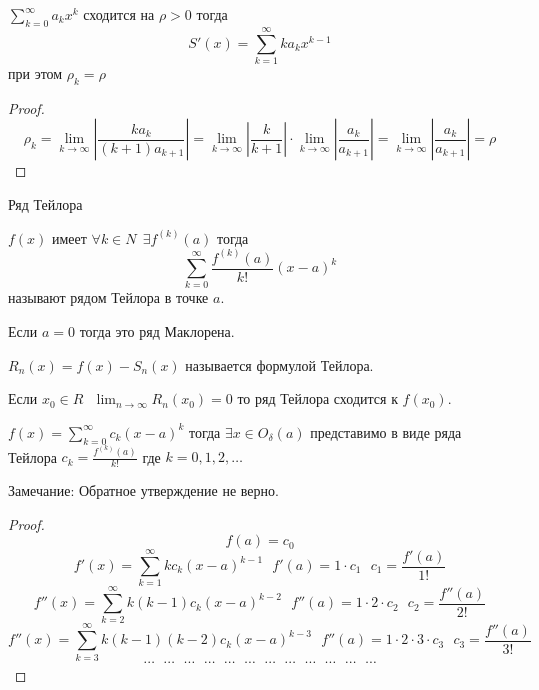 \begin{block}[Следствие 3]
  $\sum_{k=0}^{\infty} a_k x^k$ сходится на $\rho > 0$ тогда
  $$
  S'(x) = \sum_{k=1}^{\infty}k a_k x^{k-1}
  $$
  при этом $\rho_k = \rho$
\end{block}

\begin{proof}
  $$
  \rho_k = \lim_{k \to \infty} \left| \frac{k a_k}{(k+1)a_{k+1}} \right| =
  \lim_{k \to \infty} \left| \frac{k}{k+1} \right| \cdot
  \lim_{k \to \infty} \left| \frac{a_k}{a_{k+1}} \right| =
  \lim_{k \to \infty} \left| \frac{a_k}{a_{k+1}} \right| = \rho
  $$
\end{proof}

\begin{title}[\Large]
  Ряд Тейлора
\end{title}

\begin{define}
  $f(x)$ имеет $\forall k \in N ~~ \exists f^{(k)}(a)$ тогда
  $$
  \sum_{k=0}^{\infty} \frac{f^{(k)}(a)}{k!} (x-a)^k
  $$
  называют рядом Тейлора в точке $a$.

  Если $a = 0$ тогда это ряд Маклорена.

  $R_n(x) = f(x) - S_n(x)$ называется формулой Тейлора.

  Если $x_0 \in R ~~~ \lim_{n \to \infty} R_n(x_0) = 0$ то ряд Тейлора сходится
  к $f(x_0)$.
\end{define}

\begin{theorem}
  $f(x) = \sum_{k=0}^{\infty} c_k(x-a)^k$ тогда $\exists x \in O_{\delta}(a)$
  представимо в виде ряда Тейлора
  $c_k = \frac{f^{(k)}(a)}{k!}$ где $k = 0,1,2, \ldots$

  Замечание: Обратное утверждение не верно.
\end{theorem}

\begin{proof}
  $$
  f(a) = c_0
  $$
  $$
  f'(x) = \sum_{k=1}^{\infty} k c_k(x - a)^{k - 1} ~~~ f'(a) = 1 \cdot c_1 ~~~
  c_1 = \frac{f'(a)}{1!}
  $$
  $$
  f''(x) = \sum_{k=2}^{\infty} k(k-1) c_k (x - a)^{k-2} ~~~
  f''(a) = 1 \cdot 2 \cdot c_2 ~~~ c_2 = \frac{f''(a)}{2!}
  $$
  $$
  f''(x) = \sum_{k=3}^{\infty} k(k-1)(k-2) c_k (x - a)^{k-3} ~~~
  f''(a) = 1 \cdot 2 \cdot 3 \cdot c_3 ~~~ c_3 = \frac{f''(a)}{3!}
  $$
  $$
  \cdots ~~~ \cdots ~~~ \cdots ~~~ \cdots ~~~ \cdots ~~~ \cdots
  ~~~ \cdots ~~~ \cdots ~~~ \cdots ~~~ \cdots ~~~ \cdots ~~~ \cdots
  $$
\end{proof}

